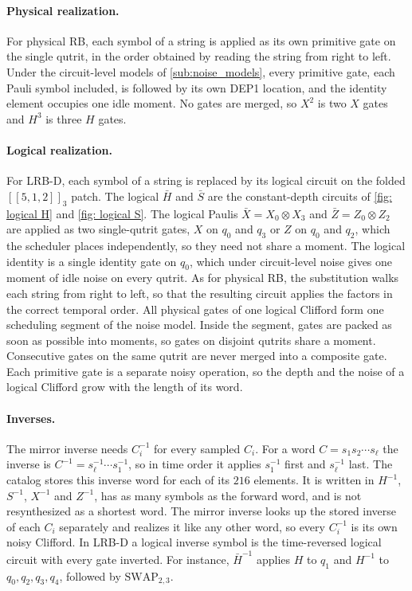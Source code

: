 \paragraph{Physical realization.}
For physical RB, each symbol of a string is applied as its own primitive gate on the single qutrit, in the order obtained by reading the string from right to left. Under the circuit-level models of \autoref{sub:noise_models}, every primitive gate, each Pauli symbol included, is followed by its own DEP1 location, and the identity element occupies one idle moment. No gates are merged, so $X^2$ is two $X$ gates and $H^3$ is three $H$ gates.

\paragraph{Logical realization.}
For LRB-D, each symbol of a string is replaced by its logical circuit on the folded $[[5,1,2]]_3$ patch. The logical $\bar{H}$ and $\bar{S}$ are the constant-depth circuits of \autoref{fig: logical H} and \autoref{fig: logical S}. The logical Paulis $\bar{X} = X_0 \otimes X_3$ and $\bar{Z} = Z_0 \otimes Z_2$ are applied as two single-qutrit gates, $X$ on $q_0$ and $q_3$ or $Z$ on $q_0$ and $q_2$, which the scheduler places independently, so they need not share a moment. The logical identity is a single identity gate on $q_0$, which under circuit-level noise gives one moment of idle noise on every qutrit. As for physical RB, the substitution walks each string from right to left, so that the resulting circuit applies the factors in the correct temporal order. All physical gates of one logical Clifford form one scheduling segment of the noise model. Inside the segment, gates are packed as soon as possible into moments, so gates on disjoint qutrits share a moment. Consecutive gates on the same qutrit are never merged into a composite gate. Each primitive gate is a separate noisy operation, so the depth and the noise of a logical Clifford grow with the length of its word.

\paragraph{Inverses.}
The mirror inverse needs $C_i^{-1}$ for every sampled $C_i$. For a word $C = s_1 s_2 \cdots s_\ell$ the inverse is $C^{-1} = s_\ell^{-1} \cdots s_1^{-1}$, so in time order it applies $s_1^{-1}$ first and $s_\ell^{-1}$ last. The catalog stores this inverse word for each of its $216$ elements. It is written in $H^{-1}$, $S^{-1}$, $X^{-1}$ and $Z^{-1}$, has as many symbols as the forward word, and is not resynthesized as a shortest word. The mirror inverse looks up the stored inverse of each $C_i$ separately and realizes it like any other word, so every $C_i^{-1}$ is its own noisy Clifford. In LRB-D a logical inverse symbol is the time-reversed logical circuit with every gate inverted. For instance, $\bar{H}^{-1}$ applies $H$ to $q_1$ and $H^{-1}$ to $q_0, q_2, q_3, q_4$, followed by $\mathrm{SWAP}_{2,3}$.

